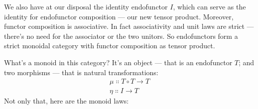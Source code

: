 \noindent
We also have at our disposal the identity endofunctor $I$, which
can serve as the identity for endofunctor composition --- our new tensor
product. Moreover, functor composition is associative. In fact
associativity and unit laws are strict --- there's no need for the
associator or the two unitors. So endofunctors form a strict monoidal
category with functor composition as tensor product.

What's a monoid in this category? It's an object --- that is an
endofunctor $T$; and two morphisms --- that is natural
transformations:
\begin{gather*}
\mu \Colon T \circ T \to T \\
\eta \Colon I \to T
\end{gather*}
Not only that, here are the monoid laws:

\begin{figure}[H]
\centering
\begin{figure}[H]
\centering
{}
\end{figure}
\end{figure}

\begin{figure}[H]
\centering
{}
\end{figure}

